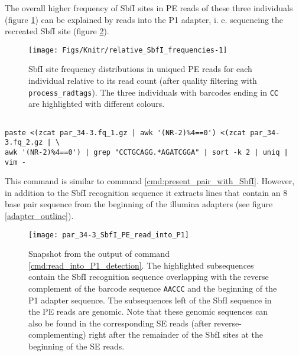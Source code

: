 \documentclass[a4paper,12pt,times,authoryear,twoside,print,index]{Classes/PhDThesisPSnPDF}\usepackage[]{graphicx}\usepackage[]{color}
\newenvironment{knitrout}{}{} %
\begin{document}
%
The overall higher frequency of SbfI sites in PE reads of these three individuals (figure \ref{relative_SbfI_frequencies}) can be explained by reads into the P1 adapter, i. e. sequencing the recreated SbfI site (figure \ref{par_34-3_SbfI_PE_read_into_P1}).
%
\begin{figure}
\begin{knitrout}
\color{fgcolor}

{\centering \texttt{[image: Figs/Knitr/relative\_SbfI\_frequencies-1]} 

}



\end{knitrout}
\caption{SbfI site frequency distributions in uniqued PE reads for each individual relative to its read count (after quality filtering with \texttt{process\_radtags}). The three individuals with barcodes ending in \texttt{CC} are highlighted with different colours.}
\label{relative_SbfI_frequencies}
\end{figure}
%
\begin{cmd}
\captionsetup{type=cmd}
\begin{Verbatim}[fontsize=\scriptsize, formatcom=\color{darkgray}]

paste <(zcat par_34-3.fq_1.gz | awk '(NR-2)%4==0') <(zcat par_34-3.fq_2.gz | \
awk '(NR-2)%4==0') | grep "CCTGCAGG.*AGATCGGA" | sort -k 2 | uniq | vim -
\end{Verbatim}
\caption{\small This command is similar to command \ref{cmd:present_pair_with_SbfI}. However, in addition to the SbfI recognition sequence it extracts lines that contain an 8 base pair sequence from the beginning of the illumina adapters (see figure \ref{adapter_outline}).}
\label{cmd:read_into_P1_detection}
\end{cmd}
%
\begin{figure}
\centering
\texttt{[image: par\_34-3\_SbfI\_PE\_read\_into\_P1]}
\caption{Snapshot from the output of command \ref{cmd:read_into_P1_detection}. The highlighted subsequences contain the SbfI recognition sequence overlapping with the reverse complement of the barcode sequence \texttt{AACCC} and the beginning of the P1 adapter sequence. The subsequences left of the SbfI sequence in the PE reads are genomic. Note that these genomic sequences can also be found in the corresponding SE reads (after reverse-complementing) right after the remainder of the SbfI sites at the beginning of the SE reads.}
\label{par_34-3_SbfI_PE_read_into_P1}
\end{figure}
\end{document}
